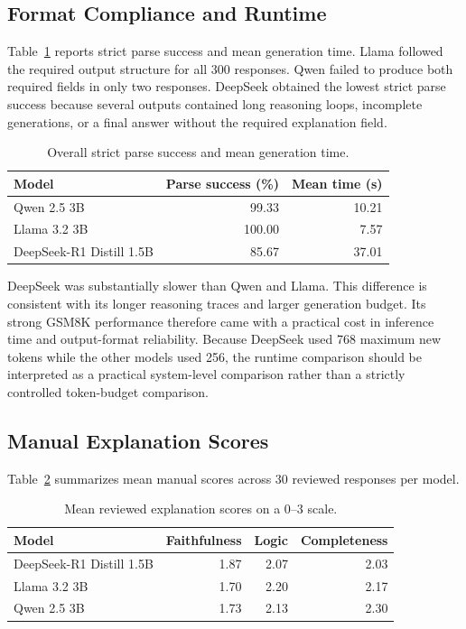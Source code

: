 \documentclass{article}
\begin{document}
\subsection{Format Compliance and Runtime}

Table~\ref{tab:efficiency} reports strict parse success and mean
generation time. Llama followed the required output structure for all
300 responses. Qwen failed to produce both required fields in only two
responses. DeepSeek obtained the lowest strict parse success because
several outputs contained long reasoning loops, incomplete generations,
or a final answer without the required explanation field.

\begin{table}[t]
\centering
\caption{Overall strict parse success and mean generation time.}
\label{tab:efficiency}
\begin{tabular}{lrr}
\toprule
\textbf{Model} &
\textbf{Parse success (\%)} &
\textbf{Mean time (s)} \\
\midrule
Qwen 2.5 3B & 99.33 & 10.21 \\
Llama 3.2 3B & 100.00 & 7.57 \\
DeepSeek-R1 Distill 1.5B & 85.67 & 37.01 \\
\bottomrule
\end{tabular}
\end{table}

DeepSeek was substantially slower than Qwen and Llama. This difference
is consistent with its longer reasoning traces and larger generation
budget. Its strong GSM8K performance therefore came with a practical
cost in inference time and output-format reliability. Because DeepSeek
used 768 maximum new tokens while the other models used 256, the runtime
comparison should be interpreted as a practical system-level comparison
rather than a strictly controlled token-budget comparison.

\subsection{Manual Explanation Scores}

Table~\ref{tab:manual_scores} summarizes mean manual scores across 30
reviewed responses per model.

\begin{table}[t]
\centering
\caption{Mean reviewed explanation scores on a 0--3 scale.}
\label{tab:manual_scores}
\begin{tabular}{lrrr}
\toprule
\textbf{Model} &
\textbf{Faithfulness} &
\textbf{Logic} &
\textbf{Completeness} \\
\midrule
DeepSeek-R1 Distill 1.5B & 1.87 & 2.07 & 2.03 \\
Llama 3.2 3B & 1.70 & 2.20 & 2.17 \\
Qwen 2.5 3B & 1.73 & 2.13 & 2.30 \\
\bottomrule
\end{tabular}
\end{table}
\end{document}
